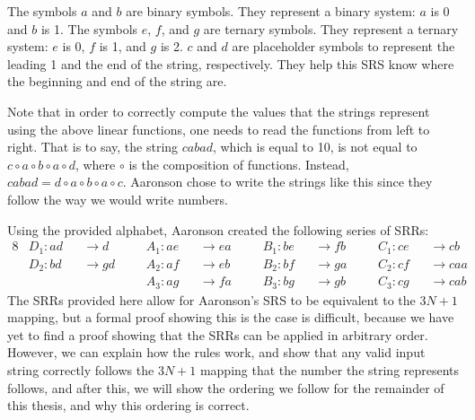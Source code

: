 The symbols $a$ and $b$ are binary symbols. They represent  a binary system: $a$ is 0 and $b$ is 1.  The symbols $e$, $f$, and $g$ are ternary symbols. They represent a ternary system: $e$ is 0, $f$ is 1, and $g$ is 2. $c$ and $d$ are placeholder symbols to represent the leading 1 and the end of the string, respectively. They help this SRS know where the beginning and end of the string are. \par
Note that in order to correctly compute the values that the strings represent using the above linear functions, one needs to read the functions from left to right. That is to say, the string $cabad$, which is equal to 10, is not equal to $ c \circ a \circ b \circ a \circ d$, where $\circ$ is the composition of functions. Instead, $cabad = d \circ a \circ b \circ a \circ c$. Aaronson chose to write the strings like this since they follow the way we would write numbers. \par
Using the provided alphabet, Aaronson created the following series of SRRs:
\begin{alignat*}{8}
    &D_1 : ad &&\rightarrow d\ \ && \ \ A_1 : ae &&\rightarrow ea\ \ && \ \ B_1 : be &&\rightarrow fb\ \ && \ \ C_1 : ce &&\rightarrow cb \\
    &D_2 : bd &&\rightarrow gd\ \ && \ \ A_2 : af &&\rightarrow eb\ \ && \ \ B_2 : bf &&\rightarrow ga\ \ && \ \ C_2 : cf &&\rightarrow caa \\
    &\ \ && \ \ && \ \  A_3 : ag &&\rightarrow fa\ \ && \ \  B_3 : bg &&\rightarrow gb\ \ && \ \ C_3 : cg &&\rightarrow cab
\end{alignat*}
The SRRs provided here allow for Aaronson's SRS to be equivalent to the $3N+1$ mapping, but a formal proof showing this is the case is difficult, because we have yet to find a proof showing that the SRRs can be applied in arbitrary order. However, we can explain how the rules work, and show that any valid input string correctly follows the $3N+1$ mapping that the number the string represents follows, and after this, we will show the ordering we follow for the remainder of this thesis, and why this ordering is correct. \par
